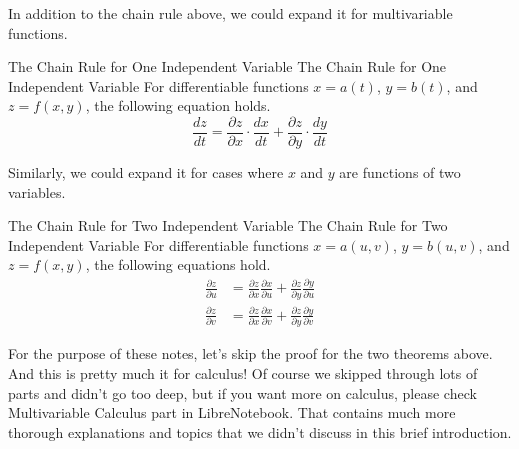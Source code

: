 \documentclass[../../../main.tex]{subfiles}
\begin{document}
In addition to the chain rule above, we could expand it for
multivariable functions.

\begin{theorem}
{The Chain Rule for One Independent Variable}
{The Chain Rule for One Independent Variable}
For differentiable functions $x = a(t)$, $y = b(t)$, and
$z = f(x, y)$, the following equation holds.
\[
\frac{dz}{dt}
= \frac{\partial z}{\partial x} \cdot \frac{dx}{dt} +
    \frac{\partial z}{\partial y} \cdot \frac{dy}{dt}
\]
\end{theorem}

Similarly, we could expand it for cases where $x$ and $y$ are
functions of two variables.

\begin{theorem}
{The Chain Rule for Two Independent Variable}
{The Chain Rule for Two Independent Variable}
For differentiable functions $x = a(u, v)$, $y = b(u, v)$,
and $z = f(x, y)$, the following equations hold.
\begin{align*}
    \frac{\partial z}{\partial u}
    &= \frac{\partial z}{\partial x} \frac{\partial x}{\partial u} +
        \frac{\partial z}{\partial y} \frac{\partial y}{\partial u} \\
    \frac{\partial z}{\partial v}
    &= \frac{\partial z}{\partial x} \frac{\partial x}{\partial v} +
        \frac{\partial z}{\partial y} \frac{\partial y}{\partial v}
\end{align*}
\end{theorem}

For the purpose of these notes, let's skip the proof for the two
theorems above. And this is pretty much it for calculus! Of course we
skipped through lots of parts and didn't go too deep, but if you want
more on calculus, please check Multivariable Calculus part in
LibreNotebook. That contains much more thorough explanations and
topics that we didn't discuss in this brief introduction.
\end{document}
